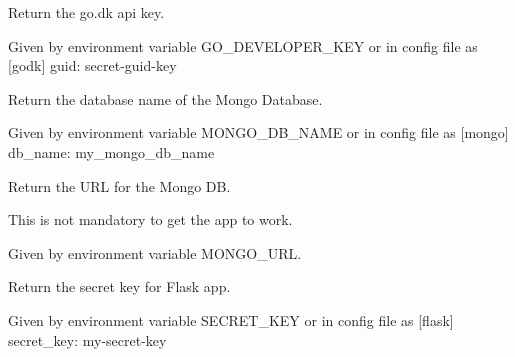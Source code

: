 \documentclass[letterpaper,10pt,english]{sphinxmanual}
\begin{document}
\begin{fulllineitems}
\begin{fulllineitems}
\label{cv_kickstarter:cv_kickstarter.cv_kickstarter_config.CvKickstarterConfig.go_key}
Return the go.dk api key.

Given by environment variable GO\_DEVELOPER\_KEY or
in config file as
{[}godk{]}
guid: secret-guid-key

\end{fulllineitems}


\begin{fulllineitems}
\label{cv_kickstarter:cv_kickstarter.cv_kickstarter_config.CvKickstarterConfig.mongo_db_name}
Return the database name of the Mongo Database.

Given by environment variable MONGO\_DB\_NAME  or in config file as
{[}mongo{]}
db\_name: my\_mongo\_db\_name

\end{fulllineitems}


\begin{fulllineitems}
\label{cv_kickstarter:cv_kickstarter.cv_kickstarter_config.CvKickstarterConfig.mongo_url}
Return the URL for the Mongo DB.

This is not mandatory to get the app to work.

Given by environment variable MONGO\_URL.

\end{fulllineitems}


\begin{fulllineitems}
\label{cv_kickstarter:cv_kickstarter.cv_kickstarter_config.CvKickstarterConfig.secret_key}
Return the secret key for Flask app.

Given by environment variable SECRET\_KEY or in config file as
{[}flask{]}
secret\_key: my-secret-key

\end{fulllineitems}


\end{fulllineitems}
\end{document}
